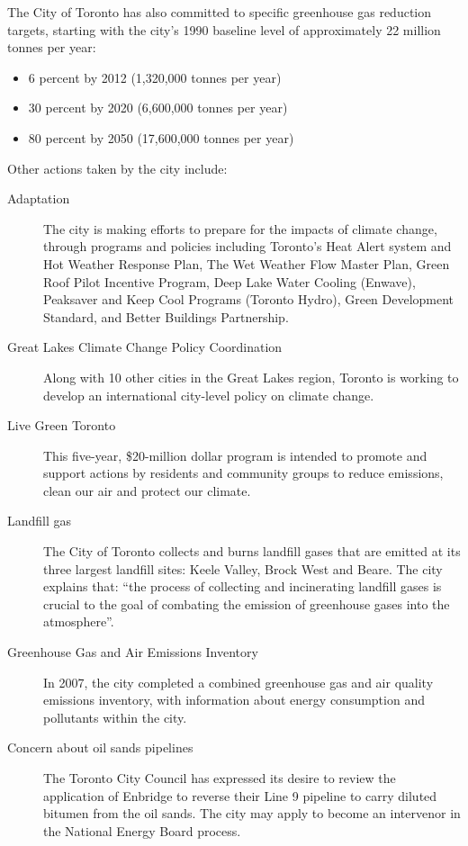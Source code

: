 The City of Toronto has also committed to specific greenhouse gas reduction targets, starting with the city's 1990 baseline level of approximately 22 million tonnes per year:\cite{TorontoAQandCC}
\begin{itemize}
	\item 6 percent by 2012 (1,320,000 tonnes per year)
	\item 30 percent by 2020 (6,600,000 tonnes per year)
	\item 80 percent by 2050 (17,600,000 tonnes per year)
\end{itemize}

Other actions taken by the city include:
\begin{description}
	\item [Adaptation] The city is making efforts to prepare for the impacts of climate change, through programs and policies including Toronto’s Heat Alert system and Hot Weather Response Plan, The Wet Weather Flow Master Plan, Green Roof Pilot Incentive Program, Deep Lake Water Cooling (Enwave), Peaksaver and Keep Cool Programs (Toronto Hydro), Green Development Standard, and Better Buildings Partnership.
	\item [Great Lakes Climate Change Policy Coordination] Along with 10 other cities in the Great Lakes region, Toronto is working to develop an international city-level policy on climate change.
	\item [Live Green Toronto] This  five-year, \$20-million dollar program is intended to promote and support actions by residents and community groups to reduce emissions, clean our air and protect our climate.
	\item [Landfill gas] The City of Toronto collects and burns landfill gases that are emitted at its three largest landfill sites: Keele Valley, Brock West and Beare. The city explains that: ``the process of collecting and incinerating landfill gases is crucial to the goal of combating the emission of greenhouse gases into the atmosphere''.\cite{TorontoAQandCC}
	\item [Greenhouse Gas and Air Emissions Inventory] In 2007, the city completed a combined greenhouse gas and air quality emissions inventory, with information about energy consumption and pollutants within the city. 
	\item [Concern about oil sands pipelines] The Toronto City Council has expressed its desire to review the application of Enbridge to reverse their Line 9 pipeline to carry diluted bitumen from the oil sands. 
	The city may apply to become an intervenor in the National Energy Board process.
\end{description}



